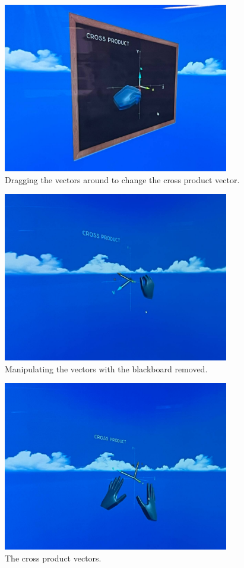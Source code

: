 \documentclass[11pt]{article}
\begin{document}
\begin{figure}[htbp]
\centering
\includegraphics[height=20em]{./images/dragging-the-vectors.jpg}
\caption{Dragging the vectors around to change the cross product vector.}
\end{figure}

\begin{figure}[htbp]
\centering
\includegraphics[height=20em]{./images/dragging-the-vectors-no-blackboard.jpg}
\caption{Manipulating the vectors with the blackboard removed.}
\end{figure}

\begin{figure}[htbp]
\centering
\includegraphics[height=20em]{./images/cross-product-vectors.jpg}
\caption{The cross product vectors.}
\end{figure}
\end{document}
